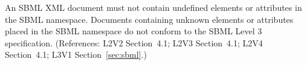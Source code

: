 An SBML XML document must not contain undefined elements or
attributes in the SBML namespace.  Documents containing unknown
elements or attributes placed in the SBML namespace do not conform
to the SBML Level 3 specification.  (References: L2V2 Section~4.1;
L2V3 Section~4.1; L2V4 Section~4.1; L3V1 Section~\ref{sec:sbml}.)
